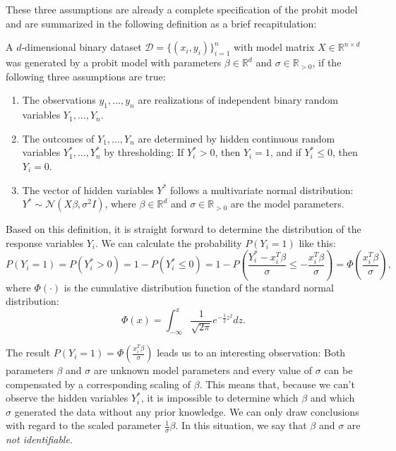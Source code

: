 These three assumptions are already a complete specification of the
probit model and are summarized in the following definition as a
brief recapitulation:

\begin{definition}
    A $d$-dimensional binary dataset $\mathcal{D} = \{(x_i, y_i)\}_{i=1}^n$
    with model matrix
    $X \in \mathbb{R}^{n \times d}$ was generated by a probit model with
    parameters $\beta \in \mathbb{R}^d$ and $\sigma \in \mathbb{R}_{>0}$, if
    the following three assumptions are true:
    \begin{enumerate}
        \item The observations $y_1, ..., y_n$ are realizations of independent
              binary random variables $Y_1, ..., Y_n$.
        \item The outcomes of $Y_1, ..., Y_n$ are determined by hidden
              continuous random variables $Y_1^\ast, ..., Y_n^\ast$ by
              thresholding: If $Y_i^\ast > 0$, then $Y_i = 1$, and if
              $Y_i^\ast \leq 0$, then $Y_i = 0$.
        \item The vector of hidden variables $Y^\ast$ follows a multivariate
              normal distribution:
              $Y^\ast \sim \mathcal{N}(X \beta, \sigma^2 I)$,
              where $\beta \in \mathbb{R}^d$ and $\sigma \in \mathbb{R}_{>0}$
              are the model parameters.
    \end{enumerate}
\end{definition}

\noindent Based on this definition, it is straight forward to determine the
distribution of the response variables $Y_i$.
We can calculate the probability $P(Y_i = 1)$ like this:
\begin{equation*}
    P(Y_i = 1) = P(Y_i^\ast > 0) = 1 - P(Y_i^\ast \leq 0)
    = 1 - P\left(\frac{Y_i^\ast - x_i^T \beta}{\sigma} \leq -\frac{x_i^T \beta}{\sigma} \right)
    = \Phi\left(\frac{x_i^T \beta}{\sigma} \right),
\end{equation*}
where $\Phi(\cdot)$ is the cumulative distribution function of the standard normal
distribution:
\begin{equation*}
    \Phi(x) = \int_{-\infty}^x \frac{1}{\sqrt{2 \pi}} e^{- \frac{1}{2} z^2} dz.
\end{equation*}

\noindent The result $P(Y_i = 1) = \Phi\left(\frac{x_i^T \beta}{\sigma} \right)$
leads us to an interesting observation:
Both parameters $\beta$ and $\sigma$ are unknown model parameters and
every value of $\sigma$ can be compensated by a corresponding scaling
of $\beta$. This means that, because we can't observe the hidden variables $Y_i^\ast$,
it is impossible to determine which $\beta$ and which $\sigma$
generated the data without any prior knowledge.
We can only draw conclusions with regard to the
scaled parameter $\frac{1}{\sigma}\beta$.
In this situation, we say that $\beta$ and $\sigma$ are
\textit{not identifiable}.

